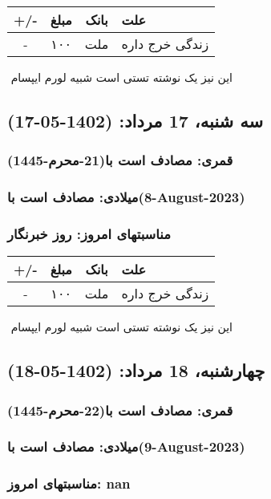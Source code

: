 \documentclass{article}
\newcommand{\rnote}[1]{\marginpar{\textcolor{color}{\StrSubstitute{\##1}{ }{\_}}}}
\newcommand{\myRow}[4]{
    #1 & #2 & #3 & #4 \\ \hline
}
\begin{document}
\begin{tabular}{ | c | c | c | p{5cm} |}
    \hline
    \myRow{ +/- }{مبلغ}{بانک}{علت}
    \myRow{-}{۱۰۰}{ملت}{زندگی خرج داره}
\end{tabular}
\newline
\newline

‌
\rnote{تست}
این نیز یک نوشته تستی است شبیه لورم ایپسام




\newpage
{}
\textcolor{color}{
\section{ سه شنبه، 17 مرداد: (1402-05-17) }
\subsubsection*{قمری: مصادف است با(21-محرم-1445)} 
\subsubsection*{میلادی: مصادف است با(8-August-2023)}
\subsubsection*{مناسبتهای امروز: روز خبرنگار}
}


\begin{tabular}{ | c | c | c | p{5cm} |}
    \hline
    \myRow{ +/- }{مبلغ}{بانک}{علت}
    \myRow{-}{۱۰۰}{ملت}{زندگی خرج داره}
\end{tabular}
\newline
\newline

‌
\rnote{تست}
این نیز یک نوشته تستی است شبیه لورم ایپسام




\newpage
{}
\textcolor{color}{
\section{ چهارشنبه، 18 مرداد: (1402-05-18) }
\subsubsection*{قمری: مصادف است با(22-محرم-1445)} 
\subsubsection*{میلادی: مصادف است با(9-August-2023)}
\subsubsection*{مناسبتهای امروز: nan}
}
\end{document}
